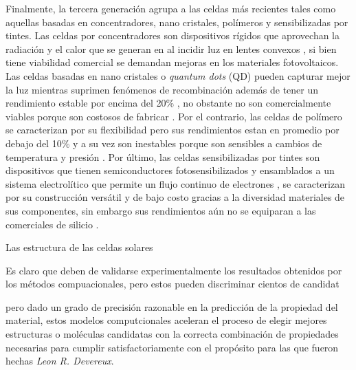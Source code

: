 Finalmente, la tercera generación agrupa a las celdas más recientes tales como aquellas basadas en concentradores, nano cristales, polímeros y sensibilizadas por tintes. Las celdas por concentradores son dispositivos rígidos que aprovechan la radiación y el calor que se generan en al incidir luz en lentes convexos \cite{bertolli2008}, si bien tiene viabilidad comercial se demandan mejoras en los materiales fotovoltaicos. Las celdas basadas en nano cristales o \textit{quantum dots} (QD) pueden capturar mejor la luz mientras suprimen fenómenos de recombinación además de tener un rendimiento estable por encima del 20\% , no obstante no son comercialmente viables porque son costosos de fabricar \cite{jean2018synthesis}. Por el contrario, las celdas de polímero se caracterizan por su flexibilidad pero sus rendimientos estan en promedio por debajo del 10\% y a su vez son inestables porque son sensibles a cambios de temperatura y presión \cite{gusain2019polymer}. Por último, las celdas sensibilizadas por tintes son dispositivos que tienen semiconductores fotosensibilizados y ensamblados a un sistema electrolítico que permite un flujo continuo de electrones \cite{suhaimi2015materials}, se caracterizan por su construcción versátil y de bajo costo gracias a la diversidad materiales de sus componentes, sin embargo sus rendimientos aún no se equiparan a las comerciales de silicio \cite{sharma2018dye}. 


Las estructura de las celdas solares 


Es claro que deben de validarse experimentalmente los resultados obtenidos por los métodos compuacionales, pero estos pueden discriminar cientos de candidat


pero dado un grado de precisión razonable  en la predicción de la propiedad del material, estos modelos computcionales aceleran el proceso de elegir mejores estructuras o moléculas candidatas con la correcta combinación de propiedades necesarias para cumplir satisfactoriamente con el propósito para las que fueron hechas \textit{Leon R. Devereux}. 

